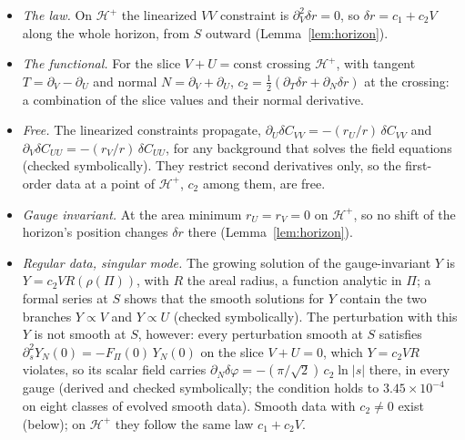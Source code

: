 \documentclass[11pt]{article}
\theoremstyle{plain}
\newcommand{\Hp}{\mathcal H^+}
\begin{document}
\begin{itemize}
\item \emph{The law.} On $\Hp$ the linearized $VV$ constraint is $\partial_V^2\delta r=0$, so $\delta r=c_1+c_2V$ along the
  whole horizon, from $S$ outward (Lemma~\ref{lem:horizon}).
\item \emph{The functional.} For the slice $V+U=\mathrm{const}$ crossing $\Hp$, with tangent $T=\partial_V-\partial_U$ and normal
  $N=\partial_V+\partial_U$, $c_2=\tfrac12(\partial_T\delta r+\partial_N\delta r)$ at the crossing: a combination of the slice
  values and their normal derivative.
\item \emph{Free.} The linearized constraints propagate, $\partial_U\delta C_{VV}=-(r_U/r)\,\delta C_{VV}$ and
  $\partial_V\delta C_{UU}=-(r_V/r)\,\delta C_{UU}$, for any background that solves the field equations (checked
  symbolically). They restrict second derivatives only, so the first-order data at a point of $\Hp$, $c_2$ among them, are
  free.
\item \emph{Gauge invariant.} At the area minimum $r_U=r_V=0$ on $\Hp$, so no shift of the horizon's position changes
  $\delta r$ there (Lemma~\ref{lem:horizon}).
\item \emph{Regular data, singular mode.} The growing solution of the gauge-invariant $Y$ is $Y=c_2VR(\rho(\Pi))$, with $R$ the
  areal radius, a function analytic in $\Pi$; a formal series at $S$ shows that the smooth solutions for $Y$ contain the two
  branches $Y\propto V$ and $Y\propto U$ (checked symbolically). The perturbation with this $Y$ is not smooth at $S$, however:
  every perturbation smooth at $S$ satisfies $\partial_s^2Y_N(0)=-F_\Pi(0)\,Y_N(0)$ on the slice $V+U=0$, which $Y=c_2VR$ violates,
  so its scalar field carries $\partial_N\delta\varphi=-(\pi/\sqrt2)\,c_2\ln|s|$ there, in every gauge (derived and checked
  symbolically; the condition holds to $3.45\times10^{-4}$ on eight classes of evolved smooth data). Smooth data with $c_2\ne0$ exist
  (below); on $\Hp$ they follow the same law $c_1+c_2V$.
\end{itemize}
\end{document}
